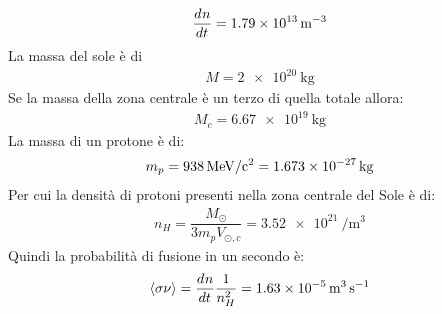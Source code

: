 \documentclass[../main.tex]{subfiles}
\begin{document}
\begin{svol}
	\begin{gather}
		\der[]{n}{t}=\SI{1.79e13}{\per\meter\cubed}
	\end{gather}
	La massa del sole è di
	\begin{gather*}
	M=\SI{2e20}{\kilo\gram}
	\end{gather*}
	Se la massa della zona centrale è un terzo di quella totale allora:
	\begin{gather}
	M_{c}=\SI{6.67e19}{\kilo\gram}
	\end{gather}
	La massa di un protone è di:
	\begin{gather*}
	m_{p}=\SI{938}{\mega\electronvolt\per c\squared}=\SI{1.673e-27}{\kilo\gram}
	\end{gather*}
	Per cui la densità di protoni presenti nella zona centrale del Sole è di:
	\begin{gather*}
	n_{H}=\dfrac{M_{\odot}}{3m_{p}V_{\odot,c}}= \SI{3.52e21}{\per\meter\cubed}
	\end{gather*}
	Quindi la probabilità di fusione in un secondo è:
	\begin{gather*}
	\left<\sigma\nu\right>=\der[]{n}{t}\dfrac{1}{n_{H}^{2}}=\SI{1.63e-5}{\meter\cubed\per\second}
	\end{gather*}
\end{svol}
\end{document}
